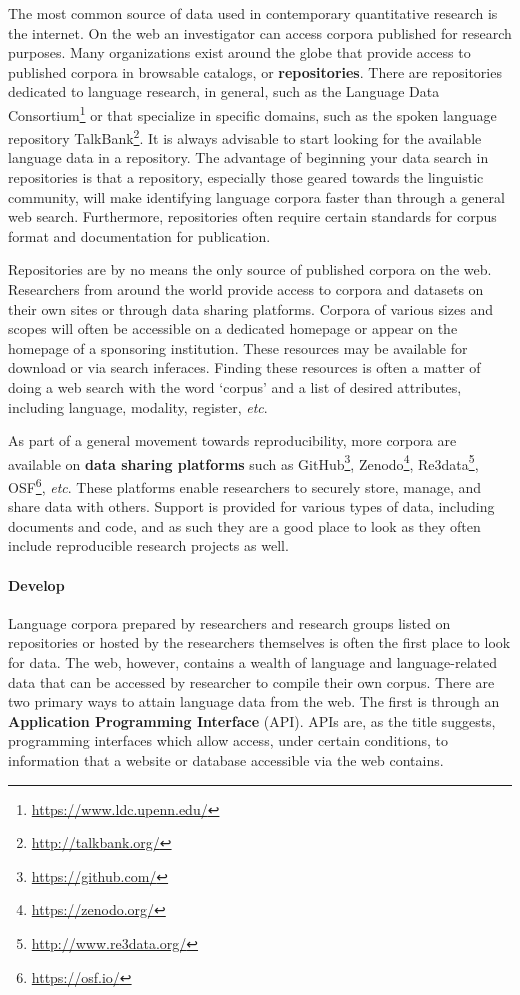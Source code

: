 \documentclass[
  letterpaper,
  DIV=11,
  numbers=noendperiod]{scrreport}
\let\oldparagraph\paragraph
\renewcommand{\paragraph}[1]{\oldparagraph{#1}\mbox{}}
\theoremstyle{definition}
\theoremstyle{remark}
\DeclareRobustCommand{\href}[2]{#2\footnote{\url{#1}}}
\begin{document}
The most common source of data used in contemporary quantitative
research is the internet. On the web an investigator can access corpora
published for research purposes. Many organizations exist around the
globe that provide access to published corpora in browsable catalogs, or
\textbf{repositories}. There are repositories dedicated to language
research, in general, such as the
\href{https://www.ldc.upenn.edu/}{Language Data Consortium} or that
specialize in specific domains, such as the spoken language repository
\href{http://talkbank.org/}{TalkBank}. It is always advisable to start
looking for the available language data in a repository. The advantage
of beginning your data search in repositories is that a repository,
especially those geared towards the linguistic community, will make
identifying language corpora faster than through a general web search.
Furthermore, repositories often require certain standards for corpus
format and documentation for publication.

Repositories are by no means the only source of published corpora on the
web. Researchers from around the world provide access to corpora and
datasets on their own sites or through data sharing platforms. Corpora
of various sizes and scopes will often be accessible on a dedicated
homepage or appear on the homepage of a sponsoring institution. These
resources may be available for download or via search inferaces. Finding
these resources is often a matter of doing a web search with the word
`corpus' and a list of desired attributes, including language, modality,
register, \emph{etc}.

As part of a general movement towards reproducibility, more corpora are
available on \textbf{data sharing platforms} such as
\href{https://github.com/}{GitHub}, \href{https://zenodo.org/}{Zenodo},
\href{http://www.re3data.org/}{Re3data}, \href{https://osf.io/}{OSF},
\emph{etc}. These platforms enable researchers to securely store,
manage, and share data with others. Support is provided for various
types of data, including documents and code, and as such they are a good
place to look as they often include reproducible research projects as
well.

\hypertarget{develop}{%
\paragraph{Develop}\label{develop}}

Language corpora prepared by researchers and research groups listed on
repositories or hosted by the researchers themselves is often the first
place to look for data. The web, however, contains a wealth of language
and language-related data that can be accessed by researcher to compile
their own corpus. There are two primary ways to attain language data
from the web. The first is through an \textbf{Application Programming
Interface} (API). APIs are, as the title suggests, programming
interfaces which allow access, under certain conditions, to information
that a website or database accessible via the web contains.
\end{document}
